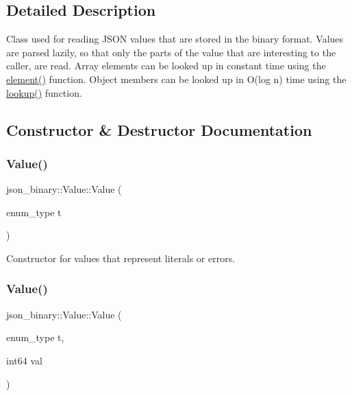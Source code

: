 \subsection{Detailed Description}
Class used for reading J\+S\+ON values that are stored in the binary format. Values are parsed lazily, so that only the parts of the value that are interesting to the caller, are read. Array elements can be looked up in constant time using the \mbox{\hyperlink{classjson__binary_1_1Value_acea99f0727f240b2ec552a8fae60855d}{element()}} function. Object members can be looked up in O(log n) time using the \mbox{\hyperlink{classjson__binary_1_1Value_a5bfd3f9c95980a2565ea9bcf35392c03}{lookup()}} function. 

\subsection{Constructor \& Destructor Documentation}
\mbox{\label{classjson__binary_1_1Value_ac0bba537527afc9a09bee2afa60aa9d1}} 
\subsubsection{\texorpdfstring{Value()}{Value()}\hspace{0.1cm}{\footnotesize\ttfamily [1/8]}}
{\footnotesize\ttfamily json\+\_\+binary\+::\+Value\+::\+Value (\begin{DoxyParamCaption}\item[{enum\+\_\+type}]{t }\end{DoxyParamCaption})\hspace{0.3cm}{\ttfamily [explicit]}}

Constructor for values that represent literals or errors. \mbox{\label{classjson__binary_1_1Value_ad595308589a4d88800fc515b076e2b8f}} 
\subsubsection{\texorpdfstring{Value()}{Value()}\hspace{0.1cm}{\footnotesize\ttfamily [2/8]}}
{\footnotesize\ttfamily json\+\_\+binary\+::\+Value\+::\+Value (\begin{DoxyParamCaption}\item[{enum\+\_\+type}]{t,  }\item[{int64}]{val }\end{DoxyParamCaption})\hspace{0.3cm}{\ttfamily [explicit]}}

